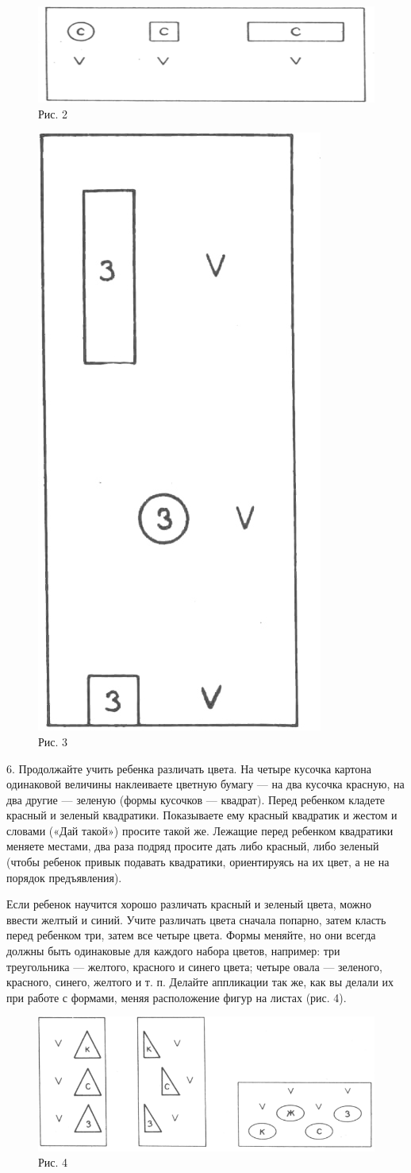 \documentclass{book}
\begin{document}
\begin{figure}
\centering
\includegraphics[width=0.6\linewidth]{media/media/image2.png}
\caption*{Рис. 2}
\end{figure}

\begin{figure}
\centering
\includegraphics[width=0.25\linewidth]{media/media/image3.jpg}
\caption*{Рис. 3}
\end{figure}

6. Продолжайте учить ребенка различать цвета. На четыре кусочка картона
одинаковой величины наклеиваете цветную бумагу --- на два кусочка
красную, на два другие --- зеленую (формы кусочков --- квадрат). Перед
ребенком кладете красный и зеленый квадратики. Показываете ему красный
квадратик и жестом и словами («Дай такой») просите такой же. Лежащие
перед ребенком квадратики меняете местами, два раза подряд просите дать
либо красный, либо зеленый (чтобы ребенок привык подавать квадратики,
ориентируясь на их цвет, а не на порядок предъявления).

Если ребенок научится хорошо различать красный и зеленый цвета, можно
ввести желтый и синий. Учите различать цвета сначала попарно, затем
класть перед ребенком три, затем все четыре цвета. Формы меняйте, но они
всегда должны быть одинаковые для каждого набора цветов, например: три
треугольника --- желтого, красного и синего цвета; четыре овала ---
зеленого, красного, синего, желтого и т. п. Делайте аппликации так же,
как вы делали их при работе с формами, меняя расположение фигур на
листах (рис. 4).

\begin{figure}
\centering
\includegraphics[width=\linewidth]{media/media/image4.png} 
\caption*{Рис. 4}
\end{figure}
\end{document}
